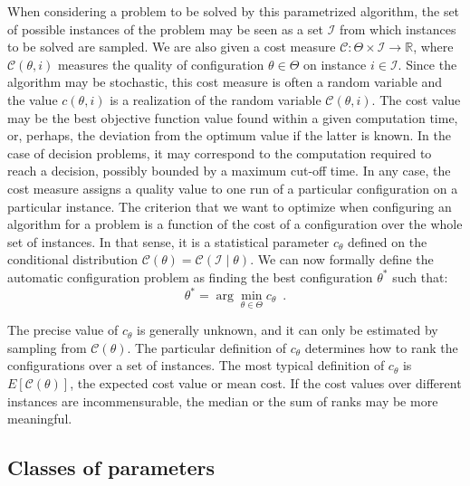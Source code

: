 \documentclass[a4paper]{article}
\begin{document}
When considering a problem to be solved by this parametrized
algorithm, the set of possible instances of the problem may be seen as
a set $\mathcal{I}$ from which instances to be solved are
sampled. We are also given a cost measure $\mathcal{C}\colon \Theta
\times \mathcal{I} \to \mathbb{R}$, where $\mathcal{C}(\theta, i)$
measures the quality of configuration $\theta \in \Theta$ on instance
$i \in \mathcal{I}$. Since the algorithm may be stochastic, this cost
measure is often a random variable and the value $c(\theta, i)$ is a
realization of the random variable $\mathcal{C}(\theta, i)$. The cost
value may be the best objective function value found within a given
computation time, or, perhaps, the deviation from the optimum value if
the latter is known. In the case of decision problems, it may
correspond to the computation required to reach a decision, possibly
bounded by a maximum cut-off time. In any case, the cost measure
assigns a quality value to one run of a particular configuration on a
particular instance. The criterion that we want to optimize when
configuring an algorithm for a problem is a function of the cost of a
configuration over the whole set of instances. In that sense, it is a
statistical parameter $c_\theta$ defined on the conditional
distribution $\mathcal{C}(\theta) = \mathcal{C}(\mathcal{I} \mid
\theta)$. We can now formally define the automatic configuration
problem as finding the best configuration $\theta^*$ such that:
%
\begin{equation}\label{eq:autoconf}
 \theta^* = \arg\min_{\theta \in \Theta} c_\theta\enspace. 
\end{equation}

The precise value of $c_\theta$ is generally unknown, and it can only
be estimated by sampling from $\mathcal{C}(\theta)$. The particular
definition of $c_\theta$ determines how to rank the configurations
over a set of instances. The most typical definition of $c_\theta$ is
$E[\mathcal{C}(\theta)]$, the expected cost value or mean cost. If the
cost values over different instances are incommensurable, the median
or the sum of ranks may be more meaningful.



\subsection{Classes of parameters}
\end{document}
